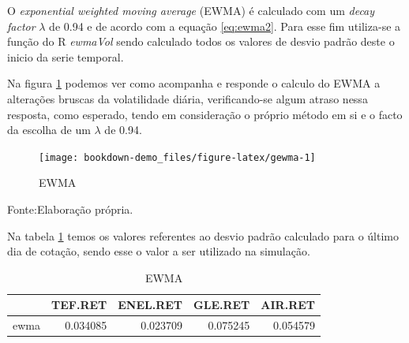\documentclass[
  12pt,
  a4paper,
  openany]{book}
\newenvironment{Shaded}{\begin{snugshade}}{\end{snugshade}}
\newcommand{\ControlFlowTok}[1]{\textcolor[rgb]{0.13,0.29,0.53}{\textbf{#1}}}
\newcommand{\DataTypeTok}[1]{\textcolor[rgb]{0.13,0.29,0.53}{#1}}
\newcommand{\DecValTok}[1]{\textcolor[rgb]{0.00,0.00,0.81}{#1}}
\newcommand{\FloatTok}[1]{\textcolor[rgb]{0.00,0.00,0.81}{#1}}
\newcommand{\KeywordTok}[1]{\textcolor[rgb]{0.13,0.29,0.53}{\textbf{#1}}}
\newcommand{\NormalTok}[1]{#1}
\newcommand{\OperatorTok}[1]{\textcolor[rgb]{0.81,0.36,0.00}{\textbf{#1}}}
\newcommand{\StringTok}[1]{\textcolor[rgb]{0.31,0.60,0.02}{#1}}
\begin{document}
O \emph{exponential weighted moving average} (EWMA) é calculado com um \emph{decay factor} \(\lambda\) de 0.94 e de acordo com a equação \eqref{eq:ewma2}. Para esse fim utiliza-se a função do R \emph{ewmaVol} sendo calculado todos os valores de desvio padrão deste o inicio da serie temporal.

\scriptsize

\begin{Shaded}
\end{Shaded}

\normalsize

Na figura \ref{fig:gewma} podemos ver como acompanha e responde o calculo do EWMA a alterações bruscas da volatilidade diária, verificando-se algum atraso nessa resposta, como esperado, tendo em consideração o próprio método em si e o facto da escolha de um \(\lambda\) de 0.94.

\begin{figure}

{\centering \texttt{[image: bookdown-demo\_files/figure-latex/gewma-1]} 

}

\caption{EWMA}\label{fig:gewma}
\end{figure}
\FloatBarrier
\centering

Fonte:Elaboração própria.

\justifying
\bigskip

Na tabela \ref{tab:ewmaval} temos os valores referentes ao desvio padrão calculado para o último dia de cotação, sendo esse o valor a ser utilizado na simulação.

\begin{table}[!h]

\caption{\label{tab:ewmaval}EWMA}
\centering
\begin{tabular}[t]{lrrrr}
\toprule
  & TEF.RET & ENEL.RET & GLE.RET & AIR.RET\\
\midrule
ewma & 0.034085 & 0.023709 & 0.075245 & 0.054579\\
\bottomrule
\end{tabular}
\end{table}
\FloatBarrier
\centering
\end{document}
